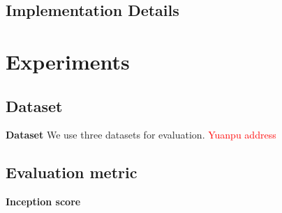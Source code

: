 \documentclass[10pt,twocolumn,letterpaper]{article}
\begin{document}
 
%			


\subsection{Implementation Details}

\section{Experiments}

\subsection{Dataset}
\textbf{Dataset} We use three datasets for evaluation. \textcolor{red}{Yuanpu address}

\subsection{Evaluation metric}
\textbf{Inception score }
\end{document}
